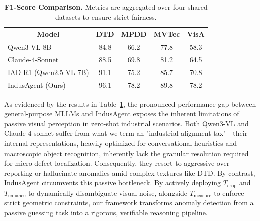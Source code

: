 \documentclass{article}
\begin{document}
{\begin{table}
  \vspace{-1.5em} %
  \centering
  \caption{\textbf{F1-Score Comparison.} Metrics are aggregated over four shared datasets to ensure strict fairness.}
  \label{tab:f1_comparison}
  \setlength{\tabcolsep}{4.5pt} %
  \footnotesize %
  \begin{tabular}{lcccc}
    \toprule
    \multicolumn{1}{c}{\textbf{Model}} & \textbf{DTD} & \textbf{MPDD} & \textbf{MVTec} & \textbf{VisA} \\
    \midrule
    Qwen3-VL-8B & 84.8 & 66.2 & 77.8 & 58.3 \\
    Claude-4-Sonnet & 88.5 & 69.8 & 81.2 & 64.5 \\
    IAD-R1 (Qwen2.5-VL-7B) & \cellcolor{best}91.1 & \cellcolor{best}75.2 & \cellcolor{best}85.7 &\cellcolor{best} 70.8 \\
    \midrule
    IndusAgent (Ours) & \cellcolor{best2}96.1 & \cellcolor{best2}78.2 & \cellcolor{best2}89.8 & \cellcolor{best2}78.2 \\
    \bottomrule
  \end{tabular}
  \vspace{-1.0em} %
\end{table}
As evidenced by the results in Table~\ref{tab:f1_comparison}, the pronounced performance gap between general-purpose MLLMs and IndusAgent exposes the inherent limitations of passive visual perception in zero-shot industrial scenarios. Both Qwen3-VL and Claude-4-sonnet suffer from what we term an "industrial alignment tax"—their internal representations, heavily optimized for conversational heuristics and macroscopic object recognition, inherently lack the granular resolution required for micro-defect localization. Consequently, they resort to aggressive over-reporting or hallucinate anomalies amid complex textures like DTD. By contrast, IndusAgent circumvents this passive bottleneck. By actively deploying $T_{\text{crop}}$ and $T_{\text{enhance}}$ to dynamically disambiguate visual noise, alongside $T_{\text{measure}}$ to enforce strict geometric constraints, our framework transforms anomaly detection from a passive guessing task into a rigorous, verifiable reasoning pipeline.

}
\end{document}
